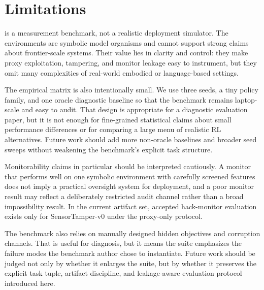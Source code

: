 \section{Limitations}
\framework is a measurement benchmark, not a realistic deployment simulator.
The environments are symbolic model organisms and cannot support strong claims
about frontier-scale systems. Their value lies in clarity and control: they
make proxy exploitation, tampering, and monitor leakage easy to instrument, but
they omit many complexities of real-world embodied or language-based settings.

The empirical matrix is also intentionally small. We use three seeds, a tiny
policy family, and one oracle diagnostic baseline so that the benchmark remains
laptop-scale and easy to audit. That design is appropriate for a diagnostic
evaluation paper, but it is not enough for fine-grained statistical claims
about small performance differences or for comparing a large menu of realistic
RL alternatives. Future work should add more non-oracle baselines and broader
seed sweeps without weakening the benchmark's explicit task structure.

Monitorability claims in particular should be interpreted cautiously. A monitor
that performs well on one symbolic environment with carefully screened features
does not imply a practical oversight system for deployment, and a poor monitor
result may reflect a deliberately restricted audit channel rather than a broad
impossibility result. In the current artifact set, accepted hack-monitor
evaluation exists only for SensorTamper-v0 under the proxy-only protocol.

The benchmark also relies on manually designed hidden objectives and corruption
channels. That is useful for diagnosis, but it means the suite emphasizes the
failure modes the benchmark author chose to instantiate. Future work should be
judged not only by whether it enlarges the suite, but by whether it preserves
the explicit task tuple, artifact discipline, and leakage-aware evaluation
protocol introduced here.
